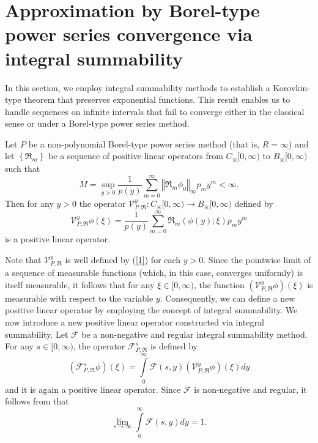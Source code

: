 \documentclass{amsart}
\theoremstyle{plain}
\numberwithin{equation}{section}
\begin{document}
\section{Approximation by Borel-type power series convergence via integral
summability}\label{sec4}

In this section, we employ integral summability methods to establish a Korovkin-type theorem that preserves exponential functions. This result enables us to handle sequences on infinite intervals that fail to converge either in the classical sense or under a Borel-type power series method.

Let $P$ be a non-polynomial Borel-type power series method (that is,
$R=\infty$) and let $\left \{  \Re_{m}\right \}  $ be a sequence of positive
linear operators from $C_{\divideontimes}[0,\infty)$ to $B_{\divideontimes
}[0,\infty)$ such that
\begin{equation}
M=\sup_{y>0}\frac{1}{p(y)}\sum_{m=0}^{\infty}\left \Vert \Re_{m}\phi
_{0}\right \Vert _{\infty}p_{m}y^{m}<\infty.\label{1}%
\end{equation}
Then for any $y>0$ the operator $\mathcal{V}_{P,\Re}^{y}:C_{\divideontimes
}[0,\infty)\rightarrow B_{\divideontimes}[0,\infty)$ defined by
\begin{equation}
\mathcal{V}_{P,\Re}^{y}\phi \left(  \xi \right)  =\frac{1}{p(y)}\sum
_{m=0}^{\infty}\Re_{m}(\phi(y);\xi)p_{m}y^{m}\label{3}%
\end{equation}
is a positive linear operator.

Note that $\mathcal{V}_{P,\Re}^{y}$ is well defined by (\ref{1}) for each
$y>0$. Since the pointwise limit of a sequence of measurable functions (which,
in this case, converges uniformly) is itself measurable, it follows that for
any $\xi \in \lbrack0,\infty)$, the function $\left(  \mathcal{V}_{P,\Re}%
^{y}\phi \right)  \left(  \xi \right)  $ is measurable with respect to the
variable $y$. Consequently, we can define a new positive linear operator by
employing the concept of integral summability. We now introduce a new positive linear operator constructed via integral summability.  
Let \( \mathcal{F} \) be a non-negative and regular integral summability method.  
For any \( s \in [0,\infty) \), the operator \( \mathcal{F}_{P,\Re}^{s} \) is defined by
\begin{equation}
\left(  \mathcal{F}_{P,\Re}^{s}\phi \right)  (\xi)={\displaystyle \int
\limits_{0}^{\infty}}\mathcal{F}(s,y)\left(  \mathcal{V}_{P,\Re}^{y}%
\phi \right)  \left(  \xi \right)  dy\label{22}%
\end{equation}
and it is again a positive linear operator. Since $\mathcal{F}$ is
non-negative and regular, it follows from \cite{connor} that
\begin{equation}
\lim_{s\rightarrow \infty}{\displaystyle \int \limits_{0}^{\infty}}%
\mathcal{F}(s,y)dy=1\text{.}\label{21}%
\end{equation}
\end{document}

